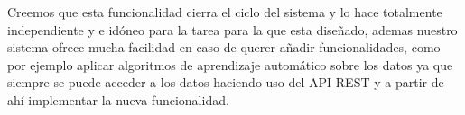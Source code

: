 \documentclass[11pt,spanish]{article}
\begin{document}
Creemos que esta funcionalidad cierra el ciclo del sistema y lo hace totalmente independiente y e idóneo para la tarea para la que esta diseñado, ademas nuestro sistema ofrece mucha facilidad en caso de querer añadir funcionalidades, como por ejemplo aplicar algoritmos de aprendizaje automático sobre los datos ya que siempre se puede acceder a los datos haciendo uso del API REST y a partir de ahí implementar la nueva funcionalidad.
\end{document}
